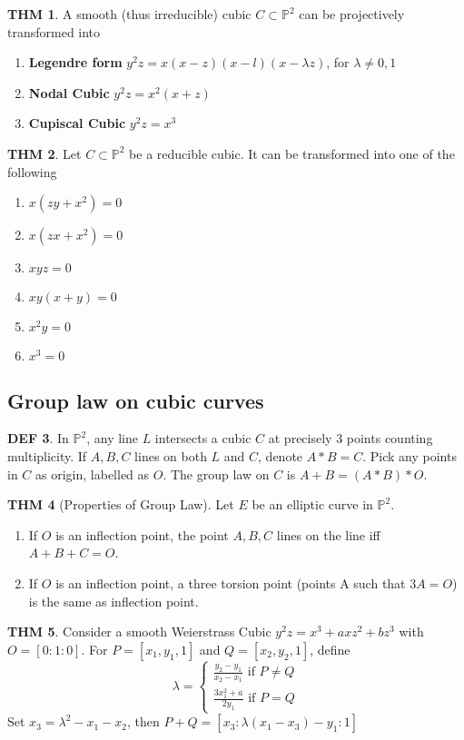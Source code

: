 \documentclass[twocolumn]{article}
\renewcommand{\emph}[1]{{\color{blue!70!black}\sffamily\bfseries #1}}
\renewcommand{\P}{\mathbb{P}}
\theoremstyle{definition}
\newtheorem{thm}{THM}
\newtheorem{defi}[thm]{DEF}
\theoremstyle{remark}
\begin{document}
\begin{thm}	A smooth (thus irreducible) cubic $C \subset \P^2$ can be projectively transformed into 
	\begin{enumerate}
		\item \emph{Legendre form} $y^2z = x(x-z)(x-l)(x-\lambda z)$, for $\lambda \neq 0, 1$
		\item \emph{Nodal Cubic }$y^2z = x^2(x+z)$
		\item \emph{Cupiscal Cubic }$y^2z = x^3$
	\end{enumerate}
\end{thm}

\begin{thm}
	Let $C \subset \P^2$ be a reducible cubic. It can be transformed into one of the following
	\begin{enumerate}
		\item $x(zy + x^2) = 0$
		\item $x(zx + x^2) = 0$
		\item $xyz = 0$
		\item $xy(x+y) = 0$
		\item $x^2y = 0$
		\item $x^3 = 0$
	\end{enumerate}
\end{thm}

\subsection{Group law on cubic curves}
\begin{defi}
	In $\P^2$, any line $L$ intersects a cubic $C$ at precisely $3$ points counting multiplicity. 
	If $A, B, C$ lines on both $L$ and $C$, denote $A*B = C$. 
	Pick any points in $C$ as origin, labelled as $O$. The group law on $C$ is $A+B = (A*B)*O$.
\end{defi}

\begin{thm}[Properties of Group Law]
	Let $E$ be an elliptic curve in $\P^2$.
	\begin{enumerate}
		\item If $O$ is an inflection point, the point $A,B, C$ lines on the line iff $A + B + C = O$.
		\item If $O$ is an inflection point, a three torsion point (points A such that $3A = O$) is the same as inflection point.
	\end{enumerate}
\end{thm}

\begin{thm}
	Consider a smooth Weierstrass Cubic $y^2z = x^3 + axz^2 + bz^3$ with $O = [0:1:0]$. 
	For  $P = [x_1, y_1, 1]$ and $Q = [x_2, y_2, 1]$, define 
	$$\lambda = \begin{cases}
		\frac{y_2 - y_1}{x_2 - x_1} \text{ if } P \neq Q \\ 
		\frac{3x_1^2 + a}{2y_1} \text{ if } P=Q
	\end{cases} 
	$$
	Set $x_3 = \lambda^2 - x_1-x_2$, then $P+Q = [x_3: \lambda(x_1 - x_3) - y_1:1]$
\end{thm}
\end{document}
